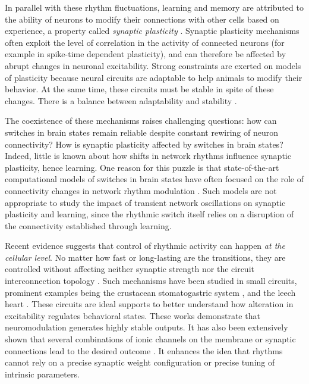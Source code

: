 In parallel with these rhythm fluctuations, learning and memory are attributed to the ability of neurons to modify their connections with other cells based on experience, a property called \textit{synaptic plasticity} \citep{citri_synaptic_2008, abbott_synaptic_2000}.  Synaptic plasticity mechanisms often exploit the level of correlation in the activity of connected neurons (for example in spike-time dependent plasticity), and can therefore be affected by abrupt changes in neuronal excitability.  Strong constraints are exerted on models of plasticity because neural circuits are adaptable to help animals to modify their behavior. At the same time, these circuits must be stable in spite of these  changes. There is a balance between adaptability and stability \citep{abbott_balancing_2003, turrigiano_activity-dependent_1994}.


The coexistence of these mechanisms raises challenging questions: how can switches in brain states remain reliable despite constant rewiring of neuron connectivity? How is synaptic plasticity affected by switches in brain states?   Indeed, little is known about how shifts in network rhythms influence synaptic plasticity, hence learning. One reason for this puzzle is that state-of-the-art computational models of switches in brain states have often focused on the role of connectivity changes in network rhythm modulation \citep{bevan_move_2002, destexhe_mechanisms_1998, esser_breakdown_2009, krishnan_cellular_2016}.  Such models are not appropriate to study the impact of transient network oscillations on synaptic plasticity and learning, since the rhythmic switch itself relies on a disruption of the connectivity established through learning. 


Recent evidence suggests that control of rhythmic activity can happen \textit{at the cellular level}. No matter how fast or long-lasting are the transitions, they are controlled without affecting neither synaptic strength nor the circuit interconnection topology \citep{marder_understanding_2007}.  Such mechanisms have been studied in small circuits, prominent examples being the crustacean stomatogastric system \citep{destexhe_circuit_2004, prinz_similar_2004, schulz_variable_2006, marder_neuromodulation_2014} , and the leech heart  \citep{olypher_using_2007, roffman_animal--animal_2012}. These circuits are ideal supports to better understand how alteration in excitability regulates behavioral states. These works demonstrate that neuromodulation generates highly stable outputs. It has also been extensively shown that several combinations of ionic channels on the membrane or synaptic connections lead to the desired outcome \citep{marder_memory_1996, schulz_variable_2006}.  It enhances the idea that rhythms cannot rely on a precise synaptic weight configuration or precise tuning of intrinsic parameters. 



